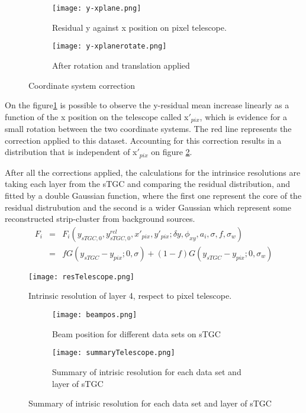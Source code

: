 \begin{figure}[ht]
	\centering
	\hfill
	\begin{subfigure}[b]{0.42\textwidth}
		\centering
		\texttt{[image: y-xplane.png]}
		\caption{Residual y against x position on pixel telescope.}\label{xyplanefit}
	\end{subfigure}
	\hfill
	\begin{subfigure}[b]{0.42\textwidth}
		\centering
		\texttt{[image: y-xplanerotate.png]}
		\caption{After rotation and translation applied}\label{xrotate}
	\end{subfigure}
	\hfill
	\caption{Coordinate system correction}\label{rotation}
\end{figure}
On the figure\ref{xyplanefit} is possible to observe the y-residual mean increase linearly as a function of the x
position on the telescope called x$'_{pix}$, which is evidence for a small rotation between the two coordinate systems. 
The red line represents the correction applied to this dataset. Accounting for this correction results in a distribution
that is independent of x$'_{pix}$ on figure \ref{xrotate}.\par
After all the corrections applied, the calculations for the intrinsice resolutions are taking each layer from the sTGC
and comparing the residual distribution, and fitted by a double Gaussian function, where the first one represent the core
of the residual distrubution and the second is a wider Gaussian which represent some reconstructed strip-cluster from
background sources.
\begin{eqnarray*}
F_i &=& F_i(y_{sTGC,0}, y_{sTGC,0}^{rel}, x'_{pix},y'_{pix};\delta y,\phi_{xy},a_i,\sigma,f,\sigma_w)\\
		&=& f G(y_{sTGC}-y_{pix};0,\sigma) + (1-f)G(y_{sTGC}-y_{pix};0,\sigma_w)
\end{eqnarray*}
\begin{figure}[ht]
\centering
\texttt{[image: resTelescope.png]}
\caption{Intrinsic resolution of layer 4, respect to pixel telescope.}\label{restelescope}
\end{figure}

\begin{figure}[ht]
\centering
\hfill
\caption{Summary of pixel telescope analysis}\label{summary}
\begin{subfigure}[b]{0.3\textwidth}
\texttt{[image: beampos.png]}
\caption{Beam position for different data sets on sTGC}\label{beampos}
\end{subfigure}
\hfill
\begin{subfigure}[b]{0.6\textwidth}
\centering
\texttt{[image: summaryTelescope.png]}
\caption{Summary of intrisic resolution for each data set and layer of sTGC}\label{}
\end{subfigure}
\hfill
\end{figure}


